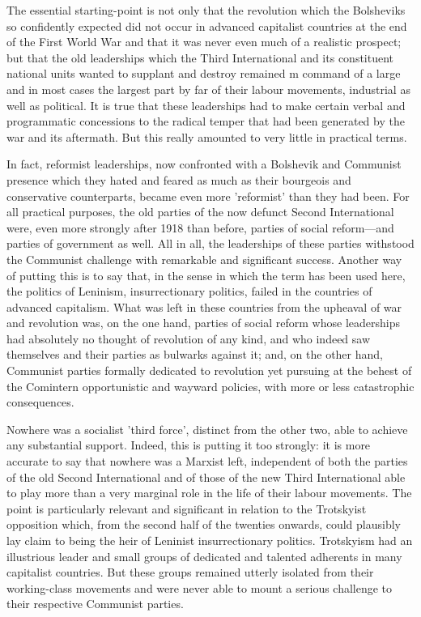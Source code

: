 The essential starting\hyp{}point is not only that the revolution which the Bolsheviks so confidently expected did not occur in advanced capitalist countries at the end of the First World War and that it was never even much of a realistic prospect; but that the old leaderships which the Third International and its constituent national units wanted to supplant and destroy remained m command of a large and in most cases the largest part by far of their labour movements, industrial as well as political. It is true that these leaderships had to make certain verbal and programmatic concessions to the radical temper that had been generated by the war and its aftermath. But this really amounted to very little in practical terms.

In fact, reformist leaderships, now confronted with a Bolshevik and Communist presence which they hated and feared as much as their bourgeois and conservative counterparts, became even more 'reformist' than they had been. For all practical purposes, the old parties of the now defunct Second International were, even more strongly after 1918 than before, parties of social reform—and parties of government as well. All in all, the leaderships of these parties withstood the Communist challenge with remarkable and significant success. Another way of putting this is to say that, in the sense in which the term has been used here,  the politics of Leninism, insurrectionary politics, failed in the countries of advanced capitalism. What was left in these countries from the upheaval of war and revolution was, on the one hand, parties of social reform whose leaderships had absolutely no thought of revolution of any kind, and who indeed saw themselves and their parties as bulwarks against it; and, on the other hand, Communist parties formally dedicated to revolution yet pursuing at the behest of the Comintern opportunistic and wayward policies, with more or less catastrophic consequences.

Nowhere was a socialist 'third force', distinct from the other two, able to achieve any substantial support. Indeed, this is putting it too strongly: it is more accurate to say that nowhere was a Marxist left, independent of both the parties of the old Second International and of those of the new Third International able to play more than a very marginal role in the life of their labour movements. The point is particularly relevant and significant in relation to the Trotskyist opposition which, from the second half of the twenties onwards, could plausibly lay claim to being the heir of Leninist insurrectionary politics. Trotskyism had an illustrious leader and small groups of dedicated and talented adherents in many capitalist countries. But these groups remained utterly isolated from their working-class movements and were never able to mount a serious challenge to their respective Communist parties.

